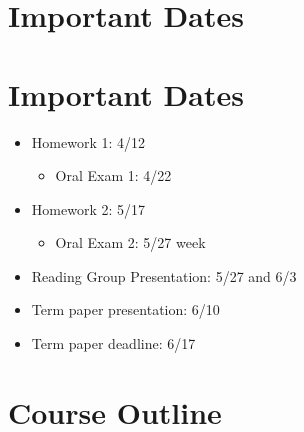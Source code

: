 \documentclass[11pt]{article}
\begin{document}
\section*{Important Dates}

\section*{Important Dates}

\begin{itemize}
	\item Homework 1: 4/12
    \begin{itemize}

	\item Oral Exam 1: 4/22
    \end{itemize} 

	\item Homework 2: 5/17
        \begin{itemize}

	\item Oral Exam 2: 5/27 week
    \end{itemize} 

	\item Reading Group Presentation: 5/27 and 6/3
	\item Term paper presentation: 6/10
	\item Term paper deadline: 6/17
\end{itemize} 

\section*{Course Outline}
\end{document}
